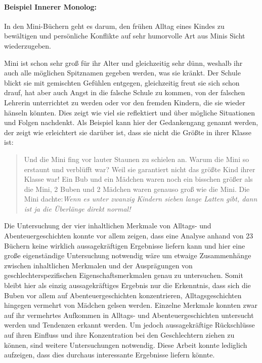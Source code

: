 \paragraph{Beispiel Innerer Monolog:}

In den Mini-Büchern geht es darum, den frühen Alltag eines Kindes zu
bewältigen und persönliche Konflikte auf sehr humorvolle Art aus Minis
Sicht wiederzugeben.

Mini ist schon sehr groß für ihr Alter und gleichzeitig sehr dünn,
weshalb ihr auch alle möglichen Spitznamen gegeben werden, was sie
kränkt. Der Schule blickt sie mit gemischten Gefühlen entgegen,
gleichzeitig freut sie sich schon drauf, hat aber auch Angst in die
falsche Schule zu kommen, von der falschen Lehrerin unterrichtet zu
werden oder vor den fremden Kindern, die sie wieder hänseln könnten.
Dies zeigt wie viel sie reflektiert und über mögliche Situationen und
Folgen nachdenkt. Als Beispiel kann hier der Gedankengang genannt
werden, der zeigt wie erleichtert sie darüber ist, dass sie nicht die
Größte in ihrer Klasse ist:

\begin{quote}
Und die Mini fing vor lauter Staunen zu schielen an. \textelp{} Warum
die Mini so erstaunt und verblüfft war? Weil sie garantiert nicht das
größte Kind ihrer Klasse war! Ein Bub und ein Mädchen waren noch ein
bisschen größer als die Mini, 2 Buben und 2 Mädchen waren genauso groß
wie die Mini. Die Mini
dachte:\emph{Wenn es unter zwanzig Kindern sieben \emph{lange Latten} gibt, dann ist ja die Überlänge direkt normal!}\parencite[][61]{Noestlinger2011}
\end{quote}

Die Untersuchung der vier inhaltlichen Merkmale von Alltags- und
Abenteuergeschichten konnte vor allem zeigen, dass eine Analyse anhand
von 23 Büchern keine wirklich aussagekräftigen Ergebnisse liefern kann
und hier eine große eigenständige Untersuchung notwendig wäre um etwaige
Zusammenhänge zwischen inhaltlichen Merkmalen und der Ausprägungen von
geschlechterspezifischen Eigenschaftsmerkmalen genau zu untersuchen.
Somit bleibt hier als einzig aussagekräftiges Ergebnis nur die
Erkenntnis, dass sich die Buben vor allem auf Abenteuergeschichten
konzentrieren, Alltagsgeschichten hingegen vermehrt von Mädchen gelsen
werden. Einzelne Merkmale konnten zwar auf ihr vermehrtes Aufkommen in
Alltags- und Abenteuergeschichten untersucht werden und Tendenzen
erkannt werden. Um jedoch aussagekräftige Rückschlüsse auf ihren
Einfluss und ihre Konzentration bei den Geschlechtern ziehen zu können,
sind weitere Untersuchungen notwendig. Diese Arbeit konnte lediglich
aufzeigen, dass dies durchaus interessante Ergebnisse liefern könnte.

